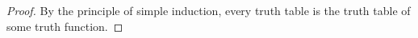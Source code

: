 \documentclass[11pt]{article}
\begin{document}
\begin{enumerate}[label=\alph*)]
\begin{proof}
            By the principle of simple induction, every truth table is the truth table of some truth function.

        \end{proof}
    \end{enumerate}
\end{document}
